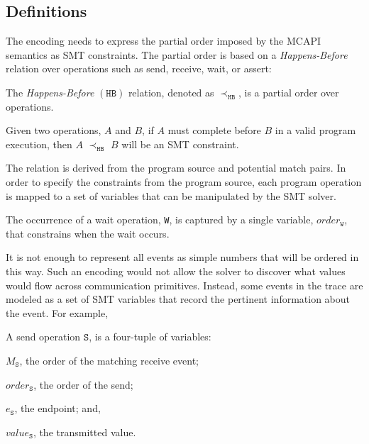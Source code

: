 \subsection{Definitions} \label{sec:smt-defns}

The encoding needs to express the partial order imposed by the MCAPI
semantics as SMT constraints. The partial order is based on a
\emph{Happens-Before} relation over operations such as send, receive,
wait, or assert:

\begin{definition}
The \emph{Happens-Before} $(\mathtt{HB})$ relation, denoted as
$\mathrm{\prec_\mathtt{HB}}$, is a partial order over operations.
\label{def:hb}
\end{definition}

Given two operations, $A$ and $B$, if $A$ must complete before $B$ in a
valid program execution, then $A$ $\mathrm{\prec_{\mathtt{HB}}}$ $B$
will be an SMT constraint.

The relation is derived from the program source and potential match pairs. In
order to specify the constraints from the program source, each program operation is mapped to a set of variables that can be manipulated by the SMT solver.

\begin{definition}[Wait] \label{def:event}
The occurrence of a wait operation, \texttt{W}, is captured by a
single variable, $\mathit{order}_\mathtt{W}$, that constrains when
the wait occurs.
\end{definition}

It is not enough to represent all events as simple numbers
that will be ordered in this way.  Such an encoding would not allow the solver to
discover what values would flow across communication primitives. Instead, some events in the trace are modeled as a set of SMT
variables that record the pertinent information about the event. For
example,

\begin{definition}[Send] \label{def:snd}
A send operation $\mathtt{S}$, is a four-tuple of variables:
\begin{compactenum}
\item $M_\mathtt{S}$, the order of the matching receive event;

\item $\mathit{order}_\mathtt{S}$, the order of the send;

\item $e_\mathtt{S}$, the endpoint; and,

\item $\mathit{value}_\mathtt{S}$, the transmitted value.
\end{compactenum}
\end{definition}

